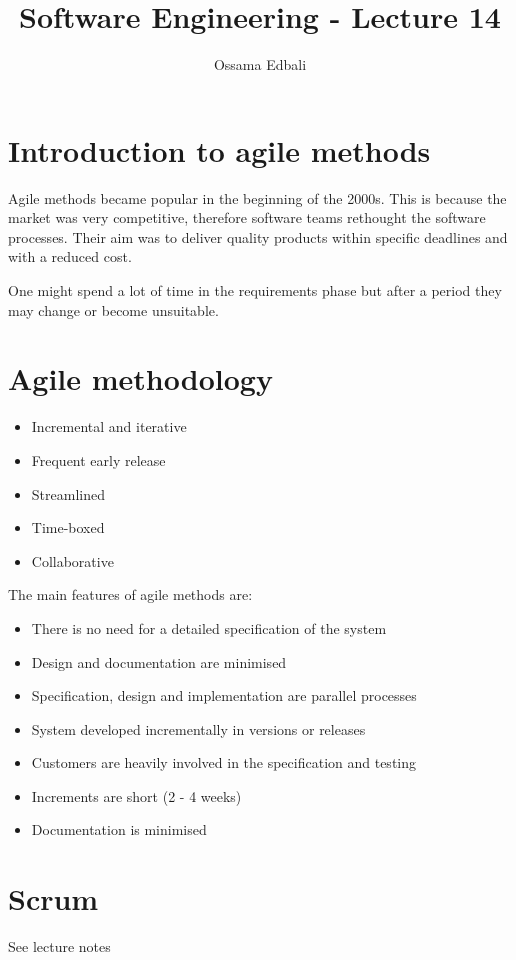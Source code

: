 \documentclass{article}
\title{Software Engineering - Lecture 14}
\author{Ossama Edbali}
\begin{document}
	
	\maketitle
	
	\section*{Introduction to agile methods}
	Agile methods became popular in the beginning of the 2000s. This is because the market
	was very competitive, therefore software teams rethought the software processes. Their aim was
	to deliver quality products within specific deadlines and with a reduced cost.	
	
	One might spend a lot of time in the requirements phase but after a period they may change or become unsuitable.
	
	\section*{Agile methodology}
	\begin{itemize}
		\item Incremental and iterative
		\item Frequent early release
		\item Streamlined
		\item Time-boxed
		\item Collaborative
	\end{itemize}		
	
	The main features of agile methods are:
	\begin{itemize}
		\item There is no need for a detailed specification of the system
		\item Design and documentation are minimised
		\item Specification, design and implementation are parallel processes
		\item System developed incrementally in versions or releases
		\item Customers are heavily involved in the specification and testing
		\item Increments are short (2 - 4 weeks)
		\item Documentation is minimised
	\end{itemize}
	
	\section*{Scrum}
	See lecture notes
		
\end{document}

